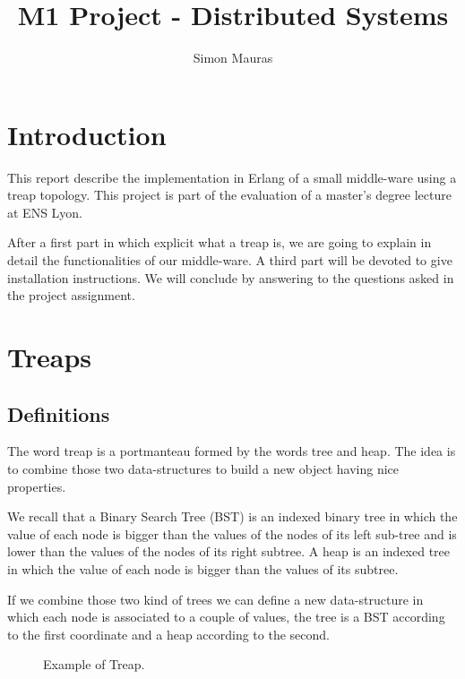 \documentclass[a4paper, 11pt]{article}
\title{M1 Project - Distributed Systems}
\author{Simon Mauras}
\begin{document}
\maketitle

\tableofcontents


\section{Introduction}

This report describe the implementation in Erlang of a small middle-ware using a treap topology. This project is part of the evaluation of a master's degree lecture at ENS Lyon.

After a first part in which explicit what a treap is, we are going to explain in detail the functionalities of our middle-ware. A third part will be devoted to give installation instructions. We will conclude by answering to the questions asked in the project assignment.

\newpage



\section{Treaps}

\subsection{Definitions}

The word treap is a portmanteau formed by the words tree and heap. The idea is to combine those two data-structures to build a new object having nice properties.

\medskip We recall that a Binary Search Tree (BST) is an indexed binary tree in which the value of each node is bigger than the values of the nodes of its left sub-tree and is lower than the values of the nodes of its right subtree. A heap is an indexed tree in which the value of each node is bigger than the values of its subtree.

\medskip If we combine those two kind of trees we can define a new data-structure in which each node is associated to a couple of values, the tree is a BST according to the first coordinate and a heap according to the second.

\begin{figure}[h!]
  \centering
  \caption{Example of Treap.}
\end{figure}
\end{document}

